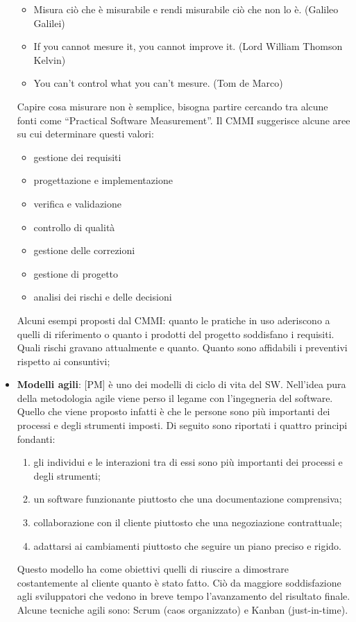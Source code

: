 \begin{itemize}
\begin{itemize}
				\item Misura ciò che è misurabile e rendi misurabile ciò che non lo è. (Galileo Galilei)
				\item If you cannot mesure it, you cannot improve it. (Lord William Thomson Kelvin)
				\item You can't control what you can't mesure. (Tom de Marco)
			\end{itemize}
			\noindent
			Capire cosa misurare non è semplice, bisogna partire cercando tra alcune fonti come ``Practical Software Measurement''. Il CMMI suggerisce alcune aree su cui determinare questi valori:
				\begin{itemize}
					\item gestione dei requisiti
					\item progettazione e implementazione
					\item verifica e validazione
					\item controllo di qualità
					\item gestione delle correzioni
					\item gestione di progetto
					\item analisi dei rischi e delle decisioni
				\end{itemize}
				\noindent
				Alcuni esempi proposti dal CMMI: quanto le pratiche in uso aderiscono a quelli di riferimento o quanto i prodotti del progetto soddisfano i requisiti. Quali rischi gravano attualmente e quanto. Quanto sono affidabili i preventivi rispetto ai consuntivi;

	\item \textbf{Modelli agili}: [PM] è uno dei modelli di ciclo di vita del SW. \newline
Nell'idea pura della metodologia agile viene perso il legame con l'ingegneria del software.
Quello che viene proposto infatti è che le persone sono più importanti dei processi e degli strumenti imposti. Di seguito sono riportati i quattro principi fondanti:
		\begin{enumerate}
			\item gli individui e le interazioni tra di essi sono più importanti dei processi e degli strumenti;
			\item un software funzionante piuttosto che una documentazione comprensiva;
			\item collaborazione con il cliente piuttosto che una negoziazione contrattuale;
			\item adattarsi ai cambiamenti piuttosto che seguire un piano preciso e rigido.
		\end{enumerate}
Questo modello ha come obiettivi quelli di riuscire a dimostrare costantemente al cliente quanto è stato fatto. Ciò da maggiore soddisfazione agli sviluppatori che vedono in breve tempo l'avanzamento del risultato finale. \newline
Alcune tecniche agili sono: Scrum (caos organizzato) e Kanban (just-in-time).


\end{itemize}
